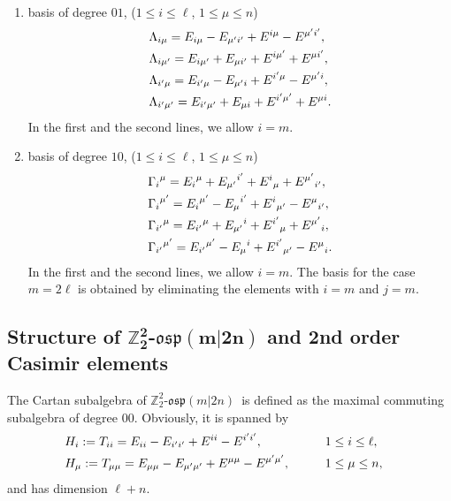 \documentclass[10pt,a4paper]{amsart}
\numberwithin{equation}{section}
\theoremstyle{definition}
\def\nn{\notag}
\def\Z2{\mathbb{Z}_2^2}
\def\osp{\mathfrak{osp}}
\def\Zosp{$\Z2$-$\osp(m|2n)$}
\begin{document}
\begin{enumerate}
\begin{align*}
	&{U_{\mu'}}^{\nu}=
	\begin{cases}
		{E_{\mu'}}^{\nu}+{E_{\nu'}}^{\mu}+{E^{\mu'}}_{\nu}+{E^{\nu'}}_{\mu},& 1 \leq \mu<\nu \leq n,\\
		{E_{\mu'}}^{\mu}+{E^{\mu'}}_{\mu},& \mu=\nu.
	\end{cases}
\end{align*}
\item[(iii)] basis of degree $01$, ($1 \leq i \leq \ell$, $1 \leq \mu \leq n$)
\begin{align*}
	&\Lambda_{i\mu}=E_{i\mu}-E_{\mu'i'}+E^{i\mu}-E^{\mu'i'},
	\notag\\
	&\Lambda_{i\mu'}=E_{i\mu'}+E_{\mu i'}+E^{i\mu'}+E^{\mu i'},
	\notag\\
	&\Lambda_{i'\mu}=E_{i'\mu}-E_{\mu'i}+E^{i'\mu}-E^{\mu'i},
	\notag\\
	&\Lambda_{i'\mu'}=E_{i'\mu'}+E_{\mu i}+E^{i'\mu'}+E^{\mu i}.
\end{align*}
In the first and the second lines, we allow $ i =m$.
\item[(iv)] basis of degree $10$, ($1 \leq i \leq \ell$, $1 \leq \mu \leq n$)
\begin{align*}
&	{\Gamma_{i}}^{\mu}={E_{i}}^{\mu}+{E_{\mu'}}^{i'}+{E^{i}}_{\mu}+{E^{\mu'}}_{i'},
	\notag\\
&	{\Gamma_{i}}^{\mu'}={E_{i}}^{\mu'}-{E_{\mu}}^{i'}+{E^{i}}_{\mu'}-{E^{\mu}}_{i'},
	\notag\\
&	{\Gamma_{i'}}^{\mu}={E_{i'}}^{\mu}+{E_{\mu'}}^{i}+{E^{i'}}_{\mu}+{E^{\mu'}}_{i},
	\notag\\
&	{\Gamma_{i'}}^{\mu'}={E_{i'}}^{\mu'}-{E_{\mu}}^{i}+{E^{i'}}_{\mu'}-{E^{\mu}}_{i}.
\end{align*}
In the first and the second lines, we allow $ i =m$.
The basis for the case $m = 2\ell$ is obtained by eliminating the elements with $i=m $ and $j=m$.
\end{enumerate}


\subsection[Structure of Z\_2\^{}2-osp(m|2n) and 2nd order Casimir elements]{Structure of $\boldsymbol{\Z2}$-$\boldsymbol{\osp(m|2n)}$ and 2nd order Casimir elements}

The Cartan subalgebra of \Zosp\ is defined as the maximal commuting subalgebra of degree $00$.
Obviously, it is spanned by
\begin{alignat}{3}
&	H_i:= T_{ii} = E_{ii} - E_{i'i'} + E^{ii} - E^{i'i'}, \qquad&&
	 1 \leq i \leq \ell ,&
	\nn \\
	&H_{\mu}:= T_{\mu\mu} = E_{\mu\mu} - E_{\mu'\mu'} + E^{\mu\mu} - E^{\mu'\mu'},\qquad
	& & 1 \leq \mu \leq n,&
\end{alignat}
and has dimension $\ell+n$.
\end{document}
